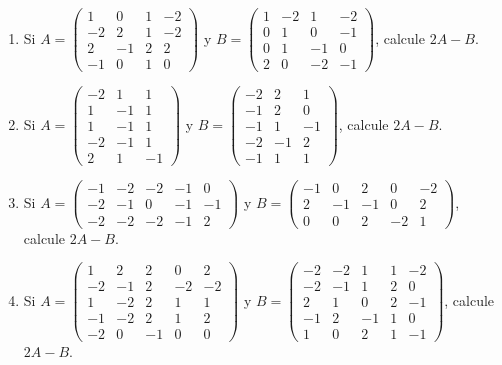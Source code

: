 \documentclass[12pt]{article}
\theoremstyle{remark}
\newcounter{contadorEjercicio}
\newenvironment{listaejercicios}{\begin{enumerate}[label=\textbf{E\arabic*.},leftmargin=2.4em,itemsep=0.52em]\setcounter{enumi}{\value{contadorEjercicio}}}{\setcounter{contadorEjercicio}{\value{enumi}}\end{enumerate}}
\begin{document}
\begin{listaejercicios}
\item Si $A=\begin{pmatrix}1&0&1&-2\\-2&2&1&-2\\2&-1&2&2\\-1&0&1&0\end{pmatrix}$ y $B=\begin{pmatrix}1&-2&1&-2\\0&1&0&-1\\0&1&-1&0\\2&0&-2&-1\end{pmatrix}$, calcule $2A-B$.

\item Si $A=\begin{pmatrix}-2&1&1\\1&-1&1\\1&-1&1\\-2&-1&1\\2&1&-1\end{pmatrix}$ y $B=\begin{pmatrix}-2&2&1\\-1&2&0\\-1&1&-1\\-2&-1&2\\-1&1&1\end{pmatrix}$, calcule $2A-B$.

\item Si $A=\begin{pmatrix}-1&-2&-2&-1&0\\-2&-1&0&-1&-1\\-2&-2&-2&-1&2\end{pmatrix}$ y $B=\begin{pmatrix}-1&0&2&0&-2\\2&-1&-1&0&2\\0&0&2&-2&1\end{pmatrix}$, calcule $2A-B$.

\item Si $A=\begin{pmatrix}1&2&2&0&2\\-2&-1&2&-2&-2\\1&-2&2&1&1\\-1&-2&2&1&2\\-2&0&-1&0&0\end{pmatrix}$ y $B=\begin{pmatrix}-2&-2&1&1&-2\\-2&-1&1&2&0\\2&1&0&2&-1\\-1&2&-1&1&0\\1&0&2&1&-1\end{pmatrix}$, calcule $2A-B$.

\end{listaejercicios}
\end{document}
